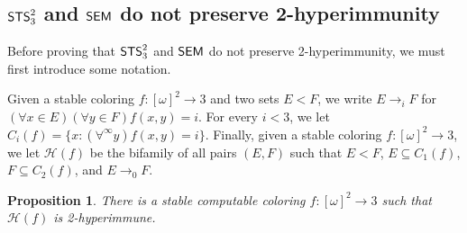 \documentclass{amsart}
\newtheorem{proposition}[theorem]{Proposition}
\theoremstyle{definition}
\theoremstyle{remark}
\numberwithin{equation}{section}
\theoremstyle{noparens}
\def\propertyL{2-hyperimmunity}
\def\hyper{2-hyperimmune}
\newcommand{\Hcal}{\mathcal{H}}
\newcommand{\s}[1]{\ensuremath{\sf{#1}}}
\DeclareMathOperator{\sts}{\s{STS}}
\DeclareMathOperator{\semo}{\s{SEM}}
\begin{document}
\subsection{$\sts^2_3$ and $\semo$ do not preserve \propertyL}
Before proving that $\sts^2_3$ and $\semo$ do not preserve \propertyL, we must first introduce some notation.

Given a stable coloring $f : [\omega]^2 \to 3$ and two sets $E < F$,
we write $E \to_i F$ for $(\forall x \in E)(\forall y \in F)f(x, y) = i$.
For every $i< 3$, we let $C_i(f) = \{ x : (\forall^{\infty} y) f(x, y) = i \}$.
Finally, given a stable coloring $f : [\omega]^2 \to 3$, we let $\Hcal(f)$
be the bifamily of all pairs $(E, F)$ such that $E < F$,
$E \subseteq C_1(f)$, $F \subseteq C_2(f)$, and $E \to_0 F$.


\begin{proposition}\label{thm:sts23-priority}
There is a stable computable coloring $f : [\omega]^2 \to 3$ such that $\Hcal(f)$ is \hyper.
\end{proposition}
\end{document}
